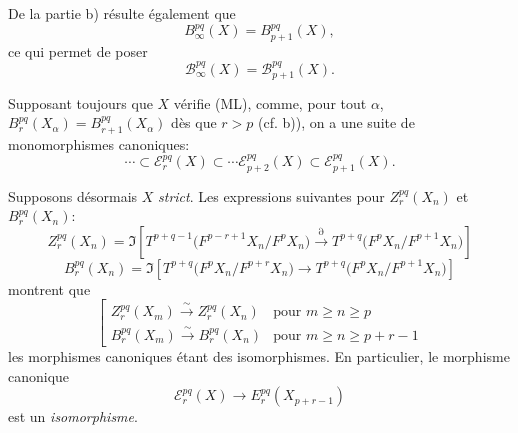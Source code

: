 De la partie b) résulte également que
\[
B_\infty^{pq}(X)=B_{p+1}^{pq}(X),
\]
ce qui permet de poser
\[
\mathcal{B}_\infty^{pq}(X)=\mathcal{B}_{p+1}^{pq}(X).
\]

Supposant toujours que \(X\) vérifie (ML), comme, pour tout \(\alpha\),
\(B_r^{pq}(X_\alpha)=B_{r+1}^{pq}(X_\alpha)\) dès que \(r>p\) (cf. b)),
on a une suite de monomorphismes canoniques:
\begin{equation}
\cdots\subset\mathcal{E}_r^{pq}(X)\subset\cdots\mathcal{E}_{p+2}^{pq}(X)\subset\mathcal{E}_{p+1}^{pq}(X).
\tag{S}
\end{equation}

Supposons désormais \(X\) \emph{strict}. Les expressions suivantes pour \(Z_r^{pq}(X_n)\) et \(B_r^{pq}(X_n)\):
\[
Z_r^{pq}(X_n)=
\Im\!\left[
T^{p+q-1}\bigl(F^{p-r+1}X_n/F^pX_n\bigr)
\xrightarrow{\partial}
T^{p+q}\bigl(F^pX_n/F^{p+1}X_n\bigr)
\right]
\]
\[
B_r^{pq}(X_n)=
\Im\!\left[
T^{p+q}\bigl(F^pX_n/F^{p+r}X_n\bigr)
\longrightarrow
T^{p+q}\bigl(F^pX_n/F^{p+1}X_n\bigr)
\right]
\]
montrent que
\begin{equation}
\left[
\begin{array}{ll}
Z_r^{pq}(X_m)\xrightarrow{\sim}Z_r^{pq}(X_n)&\text{pour }m\ge n\ge p\\[3pt]
B_r^{pq}(X_m)\xrightarrow{\sim}B_r^{pq}(X_n)&\text{pour }m\ge n\ge p+r-1
\end{array}
\right.
\tag{\(d_1\)}
\end{equation}
les morphismes canoniques étant des isomorphismes. En particulier, le morphisme canonique
\[
\mathcal{E}_r^{pq}(X)\longrightarrow E_r^{pq}(X_{p+r-1})
\]
est un \emph{isomorphisme}.

